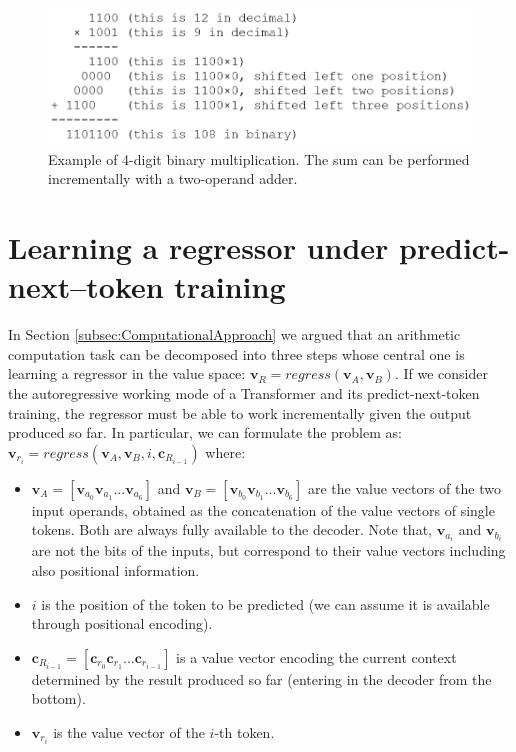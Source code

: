 \documentclass[final,1p,times,authoryear]{elsarticle}
\begin{document}
\begin{figure}[!h]
\begin{center}
\includegraphics[scale=1.2]{ExampleMultiplication}
\end{center}
\caption{Example of 4-digit binary multiplication. The sum can be performed incrementally with a two-operand adder.}
\label{figure:ExampleMultiplication}
\end{figure}

\section{Learning a regressor under predict-next–token training} \label{sec:AppendixC}

In Section \ref{subsec:ComputationalApproach} we argued that an arithmetic computation task can be decomposed into three steps whose central one is learning a regressor in the value space: $\textbf{v}_R=regress(\textbf{v}_A,\textbf{v}_B)$. If we consider the autoregressive working mode of a Transformer and its predict-next-token training, the regressor must be able to work incrementally given the output produced so far. In particular, we can formulate the problem as: $\textbf{v}_{r_i}=regress(\textbf{v}_A,\textbf{v}_B,i,\textbf{c}_{R_{i-1}})$ where:

\begin{itemize}
\item $\textbf{v}_A=[\textbf{v}_{a_0} \textbf{v}_{a_1}...\textbf{v}_{a_6}]$ and $\textbf{v}_B=[\textbf{v}_{b_0} \textbf{v}_{b_1}...\textbf{v}_{b_6}]$ are the value vectors of the two input operands, obtained as the concatenation of the value vectors of single tokens. Both are always fully available to the decoder. Note that, $\textbf{v}_{a_i}$ and $\textbf{v}_{b_i}$ are not the bits of the inputs, but correspond to their value vectors including also positional information.

\item $i$ is the position of the token to be predicted (we can assume it is available through positional encoding).

\item $\textbf{c}_{R_{i-1}}=[\textbf{c}_{r_0}\textbf{c}_{r_1}...\textbf{c}_{r_{i-1}}]$ is a value vector encoding the current context determined by the result produced so far (entering in the decoder from the bottom).

\item $\textbf{v}_{r_i}$ is the value vector of the $i$-th token. 
\end{itemize}
\end{document}

